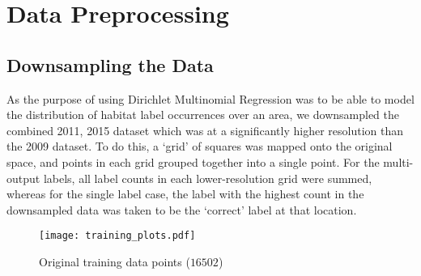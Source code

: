 \section{Data Preprocessing}

\subsection{Downsampling the Data}
As the purpose of using Dirichlet Multinomial Regression was to be able to model the distribution of habitat label occurrences over an area, we downsampled the combined 2011, 2015 dataset which was at a significantly higher resolution than the 2009 dataset. To do this, a `grid' of squares was mapped onto the original space, and points in each grid grouped together into a single point. For the multi-output labels, all label counts in each lower-resolution grid were summed, whereas for the single label case, the label with the highest count in the downsampled data was taken to be the `correct' label at that location.

% 
% 
% 
\begin{figure}[H]
    \centering
    \texttt{[image: training\_plots.pdf]}
    \caption{Original training data points ($16502$)}
    \label{fig:trainingpoints}
\end{figure} 

